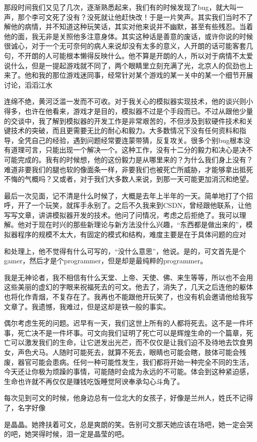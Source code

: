 \documentclass{article}
\begin{document}
那段时间我们又见了几次，逐渐熟悉起来，我们有的时候发现了bug，就大叫一声，那个李可文死了没有？没死就让他赶快改！于是一片笑声。其实我们当时不了解他的病情，并不知道这种玩笑话，其实对他来说并不幽默，甚至有些残忍。当着他的面，我无非是关照他多注意身体。其实这种话是善意的废话，或许你说的时候很诚心，对于一个无可奈何的病人来说却没有太多的意义，人开朗的话可能客套几句，不开朗的人可能根本懒得反映什么。他不算是开朗的人，所以对于病情不太爱说什么，但是一提起游戏就不同了，两个眼睛里立刻充满了光，北京人的侃劲也上来了。他和我的那位游戏迷同事，经常针对某个游戏的某一关中的某一个细节开展讨论，滔滔江水

\newpage 

连绵不绝，黄河泛滥一发而不可收。对于我关心的模拟器实现技术，他的谈兴则小得多，也许在他看来，游戏才是目的，模拟器不过是个手段而已。不过从跟他少量的交谈中，我了解到模拟器的开发工作是非常艰苦的，不但涉及到软硬件技术和关键技术的突破，而且更需要无比的耐心和毅力。大多数情况下没有任何资料和指导，全凭自己的经验，遇到问题经常要连蒙带猜，反复攻关。很多个别bug根本没有道理可言，只能出现一个解决一个。这种工作，没有十二分的毅力和决心是决不可能完成的。我有的时候想，他的这份毅力是从哪里来的？为什么我们身上没有？难道非要我们的腿也软的像面条一样，非要我们也被死亡所威胁，才能够拿出抵死不悔的气概吗？又或者，对于我们大多数人来说，到那一天可能更加消沉和绝望。

最后一次见面，记不清是什么时候了，大概是去年上半年的一天。简单地打了个招呼，开了一个玩笑，就挥手永别了。之后不久我来到CSDN，曾经跟他联系，让他写写文章，讲讲模拟器开发的技术。他问了问情况，考虑之后拒绝了。我可以理解。他对于现在时兴的那些新理论与新方法没什么兴趣，“东西都是做出来的”，模拟器程序的规模不太大，有固定的模式和结构，难度主要是在于具体问题的应对

\newpage 

和处理上，他不觉得有什么可写的，“没什么意思”，他说。是的，可文首先是个gamer，然后才是个programmer，但是却是最纯粹的programmer。

我是无神论者，我不相信有什么天堂、上帝、天使、佛、来生等等，所以也不会用这些美丽的虚幻的字眼来祝福死去的可文。他去了，消失了，几天之后连他的躯体也将化作青烟，不复存在了。我再也不能跟他开玩笑了，也没有机会邀请他给我写文章了。我遗憾，我难过，但是这却是铁一般的事实。

偶尔考虑生死的问题。迟早有一天，我们这世上所有的人都将死去。这不是一件坏事，死亡决不是一件坏事。可文向我们证明了死亡可以是辉煌生命的一个篇章，死亡可以激发我们的生命，让它迸发出光芒，而不仅仅是让我们迫不及待地去饮食男女，声色犬马。人随时可能死去，就算不死去，眼睛也可能会瞎，肢体可能会残废，器官可能会患病。任何一种可能性发生，我们都将开始一种完全不同的生活，今天还让你极为烦躁的事情，可能随时会成为永远的不可能。体会到这种紧迫感，生命也许就不再仅仅是赚钱吃饭睡觉阿谀奉承勾心斗角了。

每次见到可文的时候，他身边总有一位北大的女孩子，好像是兰州人，姓氏不记得了，名字好像

\newpage 

是晶晶。她搀扶着可文，总是爽朗的笑。告别可文那天她应该在场吧，她一定会哭的吧，她哭得时候，泪一定是晶莹的吧。
\end{document}
